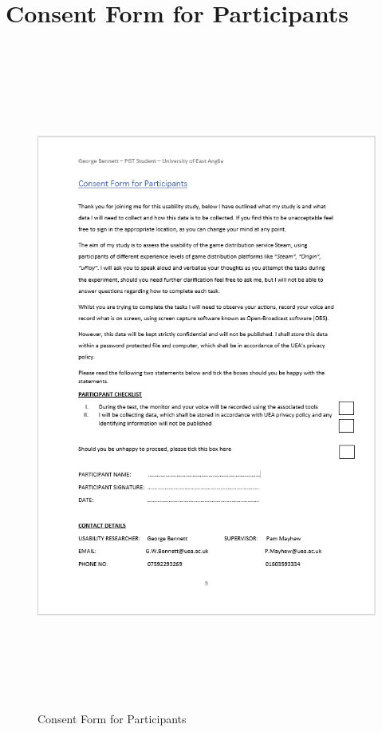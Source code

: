 \section{Consent Form for Participants}
\begin{figure}[H]
    \includegraphics[width=16cm,height=22cm]{Screenshots/StudyMaterialScreenshots/consentForm.png}
    \caption{Consent Form for Participants}
\end{figure}

